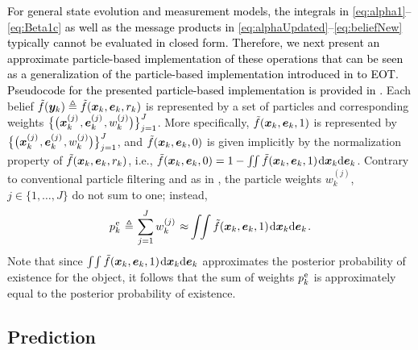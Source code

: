 \documentclass[10pt, twoside, romanappendices]{IEEEtran}
\providecommand{\rd}{\textcolor{black}}
\providecommand{\ist}{\hspace*{.3mm}}
\providecommand{\rmv}{\hspace*{-.3mm}}
\providecommand{\sist}{\hspace*{.15mm}}
\begin{document}
\rd{For general state evolution and measurement models, the integrals in \eqref{eq:alpha1}--\eqref{eq:Beta1c} as well as the message products in \eqref{eq:alphaUpdated}--\eqref{eq:beliefNew} typically cannot be evaluated in closed form.} \rd{Therefore, we next present an approximate particle-based implementation of these operations that can be seen as a generalization of the particle-based implementation introduced in \cite{MeyBraWilHla:J17} to EOT. Pseudocode for the presented particle-based implementation is provided in \cite[Section~3]{MeyWil:SM21}.} Each belief $\tilde{f}(\bm{y}_{k}) \triangleq \tilde{f}(\bm{x}_{k}, \bm{e}_{k}, r_{k})$ is represented by a set of particles and corresponding weights $\big\{ \big( \V{x}^{(j)}_{k} \ist, \V{e}^{(j)}_{k} \ist, w^{(j)}_{k} \big) \big\}_{j=1}^{J}$. 
More specifically, $\tilde{f}(\bm{x}_{k},\bm{e}_{k},1)$ is represented by $\big\{ \big( \V{x}^{(j)}_{k} \ist, \V{e}^{(j)}_{k} \ist, w^{(j)}_{k} \big) \big\}_{j=1}^{J}$, and $\tilde{f}(\bm{x}_{k},\bm{e}_{k},0)$ is 
given implicitly by the normalization property of $\tilde{f}(\bm{x}_{k},\bm{e}_{k},r_{k})$, i.e., $\tilde{f}(\V{x}_{k},\V{e}_{k},0) = 1 - \int \rmv\rmv\rmv\rmv \int \tilde{f}(\V{x}_{k},\V{e}_{k},1) \ist \mathrm{d} \V{x}_{k} \mathrm{d} \V{e}_{k}$. 
Contrary to conventional particle filtering \cite{AruMasGorCla:02,DouFreGor:01} and as in \cite{MeyBraWilHla:J17}, the particle weights $w^{(j)}_{k}$, $j \in \{1,\dots,J\}$ do not sum to one; instead, 
\begin{equation}
p^{\sist\text{e}}_{k} \ist\triangleq\ist \sum^{J}_{j=1} w^{(j)}_{k} \ist\approx\rmv \int \rmv\rmv\rmv\rmv \int \tilde{f}(\V{x}_{k}, \V{e}_{k}, 1) \ist \mathrm{d} \V{x}_{k} \mathrm{d} \V{e}_{k} \ist.
\label{eq:approxExistProb}
\end{equation}
Note that since $\int \rmv\rmv \int \tilde{f}(\V{x}_{k}, \V{e}_{k}, 1) \ist \mathrm{d} \V{x}_{k} \mathrm{d} \V{e}_{k}$ approximates the posterior probability of existence for the object, it follows that the sum of weights $p^{\sist\text{e}}_{k}$ is approximately equal to the posterior probability of existence.


\vspace{-1mm}

\subsection{Prediction}
\label{sec:pred}
\end{document}
